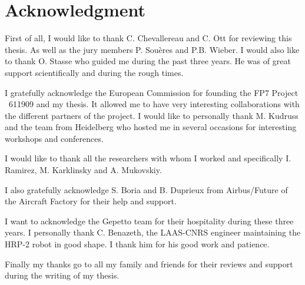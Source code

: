 \section*{Acknowledgment}

First of all, I would like to thank C. Chevallereau and C. Ott for reviewing this thesis.
As well as the jury members P. Sou\`eres and P.B. Wieber.
I would also like to thank O. Stasse who guided me during the past three years.
He was of great support scientifically and during the rough times.

I gratefully acknowledge the European Commission for founding the FP7 Project \koroibot\, 611909 and my thesis.
It allowed me to have very interesting collaborations with the different partners of the project.
I would like to personally thank M. Kudruss and the team from Heidelberg who hosted me in several occasions for interesting workshops and conferences.

I would like to thank all the researchers with whom I worked and specifically I. Ramirez, M. Karklinsky and A. Mukovskiy.

I also gratefully acknowledge S. Boria and B. Duprieux from Airbus/Future of the Aircraft Factory for their help and support.

I want to acknowledge the Gepetto team for their hospitality during these three years.
I personally thank C. Benazeth, the LAAS-CNRS engineer maintaining the HRP-2 robot in good shape.
I thank him for his good work and patience.

Finally my thanks go to all my family and friends for their reviews and support during the writing of my thesis.
